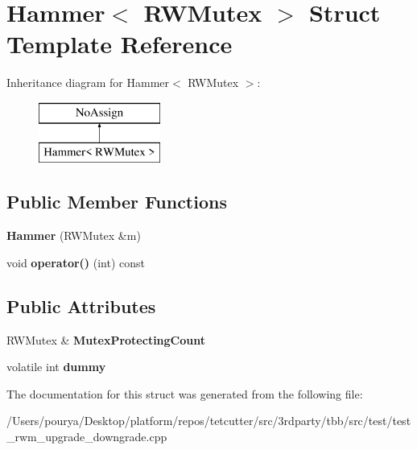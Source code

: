 \hypertarget{structHammer}{}\section{Hammer$<$ R\+W\+Mutex $>$ Struct Template Reference}
\label{structHammer}
Inheritance diagram for Hammer$<$ R\+W\+Mutex $>$\+:\begin{figure}[H]
\begin{center}
\leavevmode
\includegraphics[height=2.000000cm]{structHammer}
\end{center}
\end{figure}
\subsection*{Public Member Functions}
\begin{DoxyCompactItemize}
\item 
\hypertarget{structHammer_ab150f82d8edbee1b9aa9478834023266}{}{\bfseries Hammer} (R\+W\+Mutex \&m)\label{structHammer_ab150f82d8edbee1b9aa9478834023266}

\item 
\hypertarget{structHammer_a580090dde76f84e5fff8eef543788adc}{}void {\bfseries operator()} (int) const \label{structHammer_a580090dde76f84e5fff8eef543788adc}

\end{DoxyCompactItemize}
\subsection*{Public Attributes}
\begin{DoxyCompactItemize}
\item 
\hypertarget{structHammer_a33c187fc07d43027a4f8b1659099fced}{}R\+W\+Mutex \& {\bfseries Mutex\+Protecting\+Count}\label{structHammer_a33c187fc07d43027a4f8b1659099fced}

\item 
\hypertarget{structHammer_abf2140df8f3927d2c2428be33850fe4a}{}volatile int {\bfseries dummy}\label{structHammer_abf2140df8f3927d2c2428be33850fe4a}

\end{DoxyCompactItemize}


The documentation for this struct was generated from the following file\+:\begin{DoxyCompactItemize}
\item 
/\+Users/pourya/\+Desktop/platform/repos/tetcutter/src/3rdparty/tbb/src/test/test\+\_\+rwm\+\_\+upgrade\+\_\+downgrade.\+cpp\end{DoxyCompactItemize}
